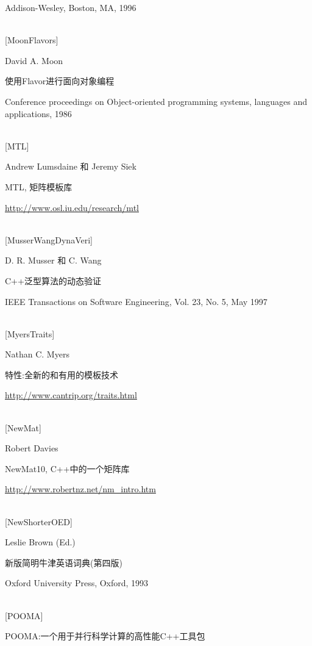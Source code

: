 Addison-Wesley, Boston, MA, 1996

\hspace*{\fill} \\ %
{[MoonFlavors]}

David A. Moon

使用Flavor进行面向对象编程

Conference proceedings on Object-oriented programming systems, languages and applications, 1986

\hspace*{\fill} \\ %
{[MTL]}

Andrew Lumsdaine 和 Jeremy Siek

MTL, 矩阵模板库

\url{http://www.osl.iu.edu/research/mtl}

\hspace*{\fill} \\ %
{[MusserWangDynaVeri]}

D. R. Musser 和 C. Wang

C++泛型算法的动态验证

IEEE Transactions on Software Engineering, Vol. 23, No. 5, May 1997

\hspace*{\fill} \\ %
{[MyersTraits]}

Nathan C. Myers

特性:全新的和有用的模板技术

\url{http://www.cantrip.org/traits.html}


\hspace*{\fill} \\ %
{[NewMat]}

Robert Davies

NewMat10, C++中的一个矩阵库

\url{http://www.robertnz.net/nm_intro.htm}


\hspace*{\fill} \\ %
{[NewShorterOED]}

Leslie Brown (Ed.)

新版简明牛津英语词典(第四版)

Oxford University Press, Oxford, 1993


\hspace*{\fill} \\ %
{[POOMA]}

POOMA:一个用于并行科学计算的高性能C++工具包


